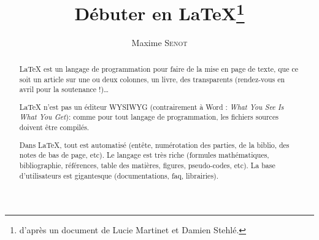 \documentclass[a4paper,11pt]{article}
\title{Débuter en \LaTeX\footnote{d'après un document de Lucie Martinet et Damien Stehl\'e.}} %
\author{Maxime \textsc{Senot}}
\begin{document}

\maketitle %

\tableofcontents %

\begin{abstract}
\LaTeX{} est un langage de programmation pour faire de la mise en page de texte, 
que ce soit un article sur une ou deux colonnes, un livre, des transparents (rendez-vous en avril pour la soutenance !)\ldots 


\noindent \LaTeX{} n'est pas un éditeur WYSIWYG (contrairement à Word : \emph{What You See Is What You Get}): 
comme pour tout langage de programmation, les fichiers sources doivent être compilés.

Dans \LaTeX{}, tout est automatisé (entête, numérotation des parties, de la biblio, des notes de bas de  page, etc). 
Le langage est très riche (formules mathématiques, bibliographie, références, table des matières, figures, pseudo-codes, etc). 
La base d'utilisateurs est gigantesque (documentations, faq, librairies). 
\end{abstract}

\end{document}
